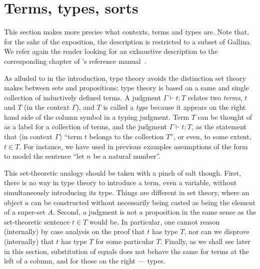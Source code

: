



\section{Terms, types, sorts}\label{sec:terms}

This section makes more precise what contexts, terms and types
are. Note that,
for the sake of the exposition,
the description is restricted to a subset of Gallina.
We refer again the reader looking for
an exhaustive description to the corresponding chapter of \Coq{}'s
reference manual~\cite{Coq:manual}.

As alluded to in the introduction, type theory avoids the distinction
set theory makes between sets and propositions: type theory is based
on a same and single collection of inductively defined terms. A
judgment $\Gamma \vdash t : T$ relates two \emph{terms}, $t$ and $T$ (in the
context $\Gamma$), and $T$ is called a \emph{type} because it appears
on the right hand side of the column symbol in a typing judgment. Term $T$ can be
thought of as a label for a collection of terms, and the judgment
$\Gamma \vdash t : T$, as the statement that (in context $\Gamma$)
``term $t$ belongs to the collection $T$'', or even, to some extent,
$t\in T$. 
For instance, we have used in previous examples assumptions of the
form  to model the sentence ``let $n$ be a natural number''.

This set-theoretic analogy should be taken with a pinch of salt
though. First, there is no way in type theory to introduce a term, even
a variable, without simultaneously introducing its type. Things are
different in set theory, where an object $a$ can be constructed without
necessarily being casted as being the element of a super-set
$A$. Second, a judgment is not a proposition in the same sense as the
set-theoretic sentence $t \in T$ would be. In particular, one cannot
reason (internally) by case analysis on the proof that
$t$ has type $T$, nor can we disprove (internally) that $t$ has type $T$ for some particular
$T$. Finally, as we shall see later in this section, substitution of
equals does not behave the same for terms at the left of a column, and
for those on the right --- types.


